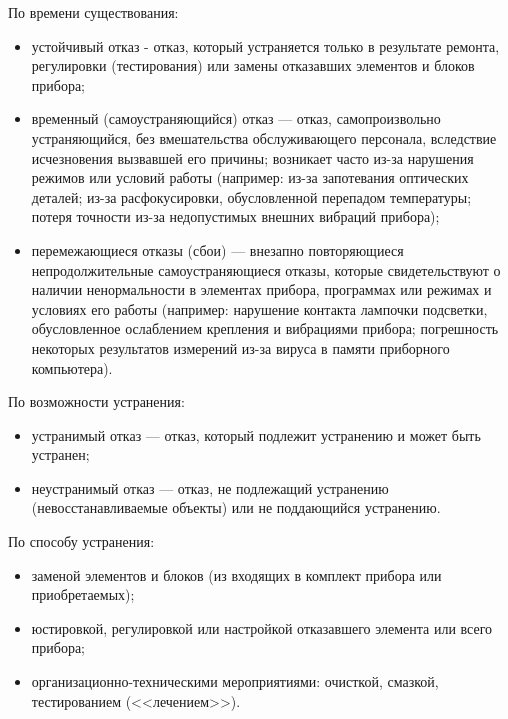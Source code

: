 По времени существования:
\begin{itemize}
\item устойчивый отказ - отказ, который устраняется только в результате ремонта, регулировки (тестирования) или замены отказавших элементов и блоков прибора;
\item временный (самоустраняющийся) отказ --- отказ, самопроизвольно устраняющийся, без вмешательства обслуживающего персонала, вследствие исчезновения вызвавшей его причины; возникает часто из-за нарушения режимов или условий работы (например: из-за запотевания оптических деталей; из-за расфокусировки, обусловленной перепадом температуры; потеря точности из-за недопустимых внешних вибраций прибора);
\item перемежающиеся отказы (сбои) --- внезапно повторяющиеся непродолжительные самоустраняющиеся отказы, которые свидетельствуют о наличии ненормальности в элементах прибора, программах или режимах и условиях его работы (например: нарушение контакта лампочки подсветки, обусловленное ослаблением крепления и вибрациями прибора; погрешность некоторых результатов измерений из-за вируса в памяти приборного компьютера). 
\end{itemize}

По возможности устранения: 
\begin{itemize}
\item устранимый отказ --- отказ, который подлежит устранению и может быть устранен;
\item неустранимый отказ --- отказ, не подлежащий устранению (невосстанавливаемые объекты) или не поддающийся устранению.
\end{itemize}

По способу устранения:
\begin{itemize}
\item заменой элементов и блоков (из входящих в комплект прибора или приобретаемых);
\item юстировкой, регулировкой или настройкой отказавшего элемента или всего прибора;
\item организационно-техническими мероприятиями: очисткой, смазкой, тестированием (<<лечением>>).
\end{itemize}


